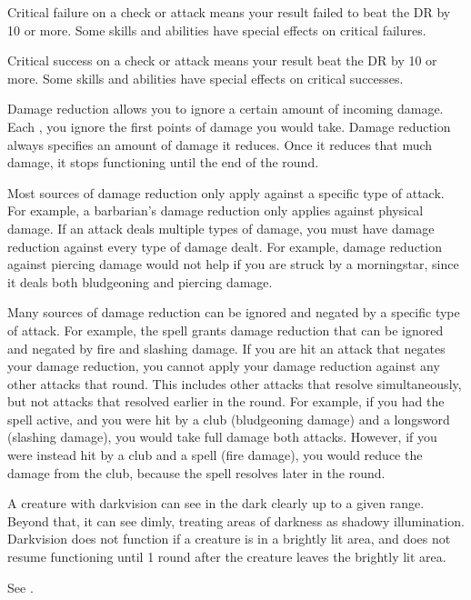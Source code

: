  Critical failure on a check or attack means your result failed to beat the DR by 10 or more.
Some skills and abilities have special effects on critical failures.

 Critical success on a check or attack means your result beat the DR by 10 or more.
Some skills and abilities have special effects on critical successes.

 Damage reduction allows you to ignore a certain amount of incoming damage.
Each , you ignore the first points of damage you would take.
Damage reduction always specifies an amount of damage it reduces.
Once it reduces that much damage, it stops functioning until the end of the round.

Most sources of damage reduction only apply against a specific type of attack.
For example, a barbarian's damage reduction only applies against physical damage.
If an attack deals multiple types of damage, you must have damage reduction against every type of damage dealt.
For example, damage reduction against piercing damage would not help if you are struck by a morningstar, since it deals both bludgeoning and piercing damage.

Many sources of damage reduction can be ignored and negated by a specific type of attack.
For example, the  spell grants damage reduction that can be ignored and negated by fire and slashing damage.
If you are hit an attack that negates your damage reduction, you cannot apply your damage reduction against any other attacks that round.
This includes other attacks that resolve simultaneously, but not attacks that resolved earlier in the round.
For example, if you had the  spell active, and you were hit by a club (bludgeoning damage) and a longsword (slashing damage), you would take full damage both attacks.
However, if you were instead hit by a club and a  spell (fire damage), you would reduce the damage from the club, because the spell resolves later in the round.

 A creature with darkvision can see in the dark clearly up to a given range.
Beyond that, it can see dimly, treating areas of darkness as shadowy illumination.
Darkvision does not function if a creature is in a brightly lit area, and does not resume functioning until 1 round after the creature leaves the brightly lit area.

 See .

